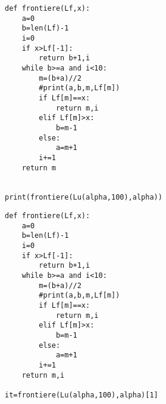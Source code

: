 




\begin{lstlisting}
def frontiere(Lf,x):
    a=0
    b=len(Lf)-1
    i=0
    if x>Lf[-1]:
        return b+1,i
    while b>=a and i<10:
        m=(b+a)//2
        #print(a,b,m,Lf[m])
        if Lf[m]==x:
            return m,i
        elif Lf[m]>x:
            b=m-1
        else:
            a=m+1
        i+=1
    return m
    
    
print(frontiere(Lu(alpha,100),alpha))
\end{lstlisting}




\begin{lstlisting}
def frontiere(Lf,x):
    a=0
    b=len(Lf)-1
    i=0
    if x>Lf[-1]:
        return b+1,i
    while b>=a and i<10:
        m=(b+a)//2
        #print(a,b,m,Lf[m])
        if Lf[m]==x:
            return m,i
        elif Lf[m]>x:
            b=m-1
        else:
            a=m+1
        i+=1
    return m,i
    
it=frontiere(Lu(alpha,100),alpha)[1]
\end{lstlisting}


%

